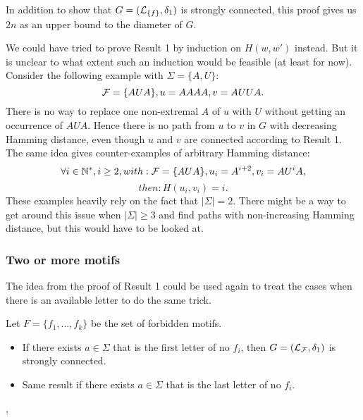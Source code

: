 \documentclass{article}
\begin{document}
In addition to show that $G = (\mathcal{L}_{\{f\}}, \delta_1)$ is strongly connected, this proof gives us $2n$ as an upper bound to the diameter of $G$.

We could have tried to prove Result 1 by induction on $H(w,w')$ instead. But it is unclear to what extent such an induction would be feasible (at least for now). Consider the following example with $\Sigma = \{A,U\}:$
$$ \mathcal{F} = \{AUA\}, u=AAAA, v=AUUA.$$
There is no way to replace one non-extremal $A$ of $u$ with $U$ without getting an occurrence of $AUA$. Hence there is no path from $u$ to $v$ in $G$ with decreasing Hamming distance, even though $u$ and $v$ are connected according to Result 1. The same idea gives counter-examples of arbitrary Hamming distance:
$$\forall i \in \mathbb{N}^*, i \geq 2, with: \mathcal{F} = \{AUA\}, u_i=A^{i+2}, v_i=A U^i A,$$
$$then: H(u_i,v_i) = i.$$
These examples heavily rely on the fact that $|\Sigma|=2$. There might be a way to get around this issue when $|\Sigma| \geq 3$ and find paths with non-increasing Hamming distance, but this would have to be looked at.

\subsubsection{Two or more motifs}

The idea from the proof of Result 1 could be used again to treat the cases when there is an available letter to do the same trick.
\begin{result}
	Let $F = \{f_1,...,f_k\}$ be the set of forbidden motifs.
	\begin{itemize}
		\item If there exists $a \in \Sigma$ that is the first letter of no $f_i$, then $G = (\mathcal{L}_{\mathcal{F}}, \delta_1)$ is strongly connected.
		\item Same result if there exists $a \in \Sigma$ that is the last letter of no $f_i$.
	\end{itemize},
\end{result}
\end{document}

